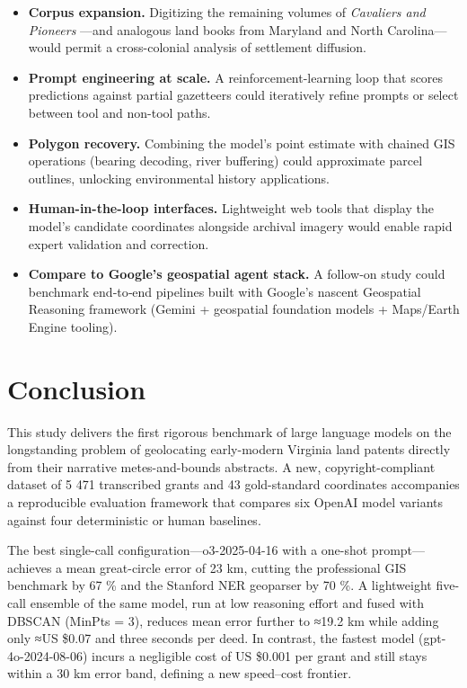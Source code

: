 \begin{itemize}
\tightlist
\item
  \textbf{Corpus expansion.} Digitizing the remaining volumes of
  \emph{Cavaliers and Pioneers} \citep{Nugent1979_cavaliers3}---and
  analogous land books from Maryland and North Carolina---would permit a
  cross-colonial analysis of settlement diffusion.
\item
  \textbf{Prompt engineering at scale.} A reinforcement-learning loop
  that scores predictions against partial gazetteers could iteratively
  refine prompts or select between tool and non-tool paths.
\item
  \textbf{Polygon recovery.} Combining the model's point estimate with
  chained GIS operations (bearing decoding, river buffering) could
  approximate parcel outlines, unlocking environmental history
  applications.
\item
  \textbf{Human-in-the-loop interfaces.} Lightweight web tools that
  display the model's candidate coordinates alongside archival imagery
  would enable rapid expert validation and correction.
\item
  \textbf{Compare to Google's geospatial agent stack.} A follow‑on study
  could benchmark end‑to‑end pipelines built with Google's nascent
  Geospatial Reasoning framework (Gemini + geospatial foundation models
  + Maps/Earth Engine tooling).
\end{itemize}

\section{Conclusion}\label{conclusion}

This study delivers the first rigorous benchmark of large language
models on the longstanding problem of geolocating early-modern Virginia
land patents directly from their narrative metes-and-bounds abstracts. A
new, copyright-compliant dataset of 5 471 transcribed grants and 43
gold-standard coordinates accompanies a reproducible evaluation
framework that compares six OpenAI model variants against four
deterministic or human baselines.

The best single-call configuration---o3-2025-04-16 with a one-shot
prompt---achieves a mean great-circle error of 23 km, cutting the
professional GIS benchmark by 67 \% and the Stanford NER geoparser by 70
\%. A lightweight five-call ensemble of the same model, run at low
reasoning effort and fused with DBSCAN (MinPts = 3), reduces mean error
further to ≈19.2 km while adding only ≈US \$0.07 and three seconds per
deed. In contrast, the fastest model (gpt-4o-2024-08-06) incurs a
negligible cost of US \$0.001 per grant and still stays within a 30 km
error band, defining a new speed--cost frontier.

